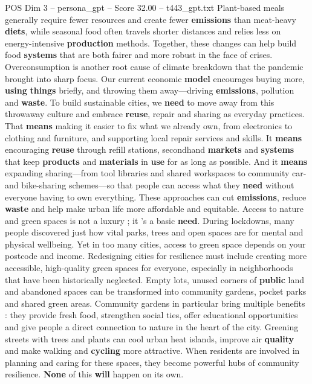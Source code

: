 \begin{textsample}{POS Dim 3 – persona\_gpt – Score 32.00 – t443\_gpt.txt}
Plant-based meals generally require fewer resources and create fewer \textbf{emissions} than meat-heavy \textbf{diets}, while seasonal food often travels shorter distances and relies less on energy-intensive \textbf{production} methods.
Together, these changes can help build food \textbf{systems} that are both fairer and more robust in the face of crises.
Overconsumption is another root cause of climate breakdown that the pandemic brought into sharp focus.
Our current economic \textbf{model} encourages buying more, \textbf{using} \textbf{things} briefly, and throwing them away—driving \textbf{emissions}, pollution and \textbf{waste}.
To build sustainable cities, we \textbf{need} to move away from this throwaway culture and embrace \textbf{reuse}, repair and sharing as everyday practices.
That \textbf{means} making it easier to fix what we already own, from electronics to clothing and furniture, and supporting local repair services and skills.
It \textbf{means} encouraging \textbf{reuse} through refill stations, secondhand \textbf{markets} and \textbf{systems} that keep \textbf{products} and \textbf{materials} in \textbf{use} for as long as possible.
And it \textbf{means} expanding sharing—from tool libraries and shared workspaces to community car- and bike-sharing schemes—so that people can access what they \textbf{need} without everyone having to own everything.
These approaches can cut \textbf{emissions}, reduce \textbf{waste} and help make urban life more affordable and equitable.
Access to nature and green spaces is not a luxury ; it ’s a basic \textbf{need}.
During lockdowns, many people discovered just how vital parks, trees and open spaces are for mental and physical wellbeing.
Yet in too many cities, access to green space depends on your postcode and income.
Redesigning cities for resilience must include creating more accessible, high-quality green spaces for everyone, especially in neighborhoods that have been historically neglected.
Empty lots, unused corners of \textbf{public} land and abandoned spaces can be transformed into community gardens, pocket parks and shared green areas.
Community gardens in particular bring multiple benefits : they provide fresh food, strengthen social ties, offer educational opportunities and give people a direct connection to nature in the heart of the city.
Greening streets with trees and plants can cool urban heat islands, improve air \textbf{quality} and make walking and \textbf{cycling} more attractive.
When residents are involved in planning and caring for these spaces, they become powerful hubs of community resilience. \textbf{None} of this \textbf{will} happen on its own.

\end{textsample}
